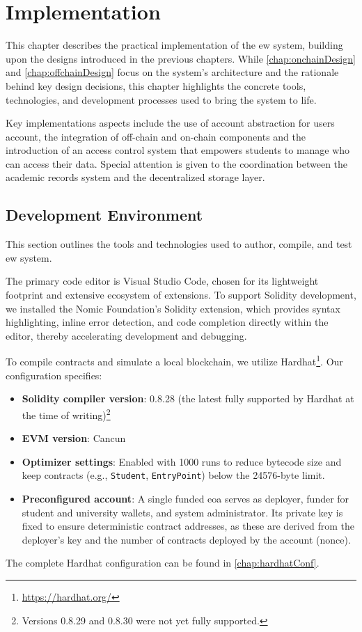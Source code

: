 \chapter{Implementation}
\label{chap:implementation}
This chapter describes the practical implementation of the \acrlong{ew} system, building upon the designs introduced in the previous chapters. While \cref{chap:onchainDesign} and \cref{chap:offchainDesign} focus on the system's architecture and the rationale behind key design decisions, this chapter highlights the concrete tools, technologies, and development processes used to bring the system to life.

Key implementations aspects include the use of account abstraction for users account, the integration of off-chain and on-chain components and the introduction of an access control system that empowers students to manage who can access their data. Special attention is given to the coordination between the academic records system and the decentralized storage layer. 

\section{Development Environment}
This section outlines the tools and technologies used to author, compile, and test \acrlong{ew} system.

The primary code editor is Visual Studio Code, chosen for its lightweight footprint and extensive ecosystem of extensions. To support Solidity development, we installed the Nomic Foundation's Solidity extension, which provides syntax highlighting, inline error detection, and code completion directly within the editor, thereby accelerating development and debugging.

To compile contracts and simulate a local blockchain, we utilize Hardhat\footnote{\url{https://hardhat.org/}}. Our configuration specifies:
\begin{itemize}
    \item \textbf{Solidity compiler version}: 0.8.28 (the latest fully supported by Hardhat at the time of writing)\footnote{Versions 0.8.29 and 0.8.30 were not yet fully supported.}
    \item \textbf{EVM version}: Cancun
    \item \textbf{Optimizer settings}: Enabled with 1000 runs to reduce bytecode size and keep contracts (e.g., \texttt{Student}, \texttt{EntryPoint}) below the 24576-byte limit.
    \item \textbf{Preconfigured account}: A single funded \acrshort{eoa} serves as deployer, funder for student and university wallets, and system administrator. Its private key is fixed to ensure deterministic contract addresses, as these are derived from the deployer’s key and the number of contracts deployed by the account (nonce).
\end{itemize}
The complete Hardhat configuration can be found in \cref{chap:hardhatConf}.

